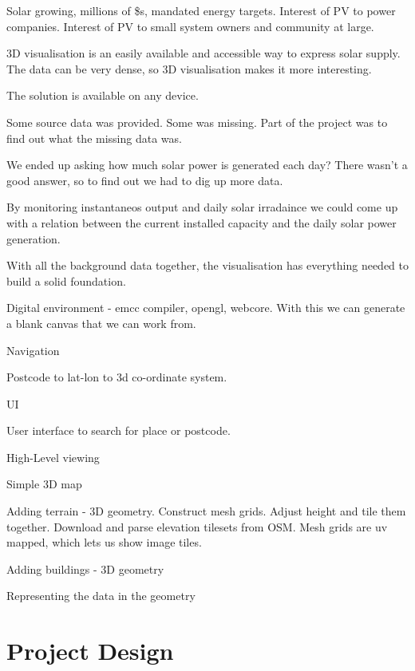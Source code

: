 \documentclass[10pt, a4paper]{article}
\begin{document}
\begin{multicols}{2}
Solar growing, millions of \$s, mandated energy targets.
Interest of PV to power companies.
Interest of PV to small system owners and community at large.

3D visualisation is an easily available and accessible way to express solar supply. The data can be very dense, so 3D visualisation makes it more interesting.

The solution is available on any device.

Some source data was provided. Some was missing. Part of the project was to find out what the missing data was.

We ended up asking how much solar power is generated each day? There wasn't a good answer, so to find out we had to dig up more data.

By monitoring instantaneos output and daily solar irradaince we could come up with a relation between the current installed capacity and the daily solar power generation.

With all the background data together, the visualisation has everything needed to build a solid foundation.

Digital environment - emcc compiler, opengl, webcore. With this we can generate a blank canvas that we can work from.

Navigation

Postcode to lat-lon to 3d co-ordinate system.

UI

User interface to search for place or postcode.

High-Level viewing

Simple 3D map

Adding terrain - 3D geometry. 
Construct mesh grids. 
Adjust height and tile them together. 
Download and parse elevation tilesets from OSM. 
Mesh grids are uv mapped, which lets us show image tiles.

Adding buildings - 3D geometry

Representing the data in the geometry




\section{Project Design}


\end{multicols}
\end{document}
